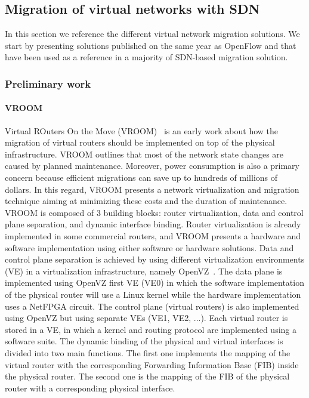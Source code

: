 \subsection{Migration of virtual networks with SDN}
In this section we reference the different virtual network migration solutions.
We start by presenting solutions published on the same year as OpenFlow and that have been used as a reference in a majority of SDN-based migration solution.

\subsubsection{Preliminary work}

\paragraph{VROOM}
Virtual ROuters On the Move (VROOM)~\cite{VROOM-Wang2008} is an early work about how the migration of virtual routers should be implemented on top of the physical infrastructure. 
VROOM outlines that most of the network state changes are caused by planned maintenance.
Moreover, power consumption is also a primary concern because efficient migrations can save up to hundreds of millions of dollars.
In this regard, VROOM presents a network virtualization and migration technique aiming at minimizing these costs and the duration of maintenance.
VROOM is composed of 3 building blocks: router virtualization, data and control plane separation, and dynamic interface binding.
Router virtualization is already implemented in some commercial routers, and VROOM presents a hardware and software implementation using either software or hardware solutions.
Data and control plane separation is achieved by using different virtualization environments (VE) in a virtualization infrastructure, namely OpenVZ~\cite{openvz}.
The data plane is implemented using OpenVZ first VE (VE0) in which the software implementation of the physical router will use a Linux kernel while the hardware implementation uses a NetFPGA circuit.
The control plane (\ie virtual routers) is also implemented using OpenVZ but using separate VEs (VE1, VE2, ...).
Each virtual router is stored in a VE, in which a kernel and routing protocol are implemented using a software suite.
The dynamic binding of the physical and virtual interfaces is divided into two main functions.
The first one implements the mapping of the virtual router with the corresponding Forwarding Information Base (FIB) inside the physical router.
The second one is the mapping of the FIB of the physical router with a corresponding physical interface.

